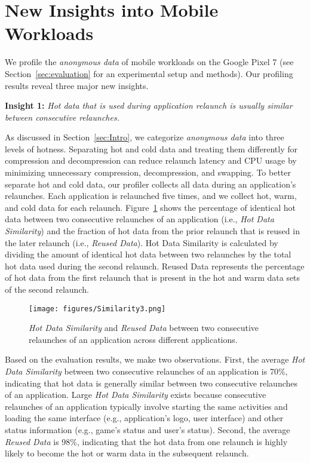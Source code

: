 \section{New Insights into Mobile Workloads} 
\label{sec:insights}
We profile the \emph{anonymous data} of mobile workloads on the Google Pixel 7 (see Section~\ref{sec:evaluation} for an experimental setup and methods). Our profiling results reveal three major new insights.

\noindent\textbf{Insight 1:} \textit{Hot data that is used during application relaunch is usually similar between consecutive relaunches.}

As discussed in Section~\ref{sec:Intro}, we categorize \emph{anonymous data} into three levels of hotness. Separating hot and cold data and treating them differently for compression and decompression can reduce relaunch latency and CPU usage by minimizing unnecessary compression, decompression, and swapping. 
To better separate hot and cold data, our profiler collects all data during an application's relaunches.  Each application is relaunched five times, and we collect hot, warm, and cold data for each relaunch. 
Figure~\ref{fig:similarity} shows the percentage of identical hot data between two consecutive relaunches of an application (i.e., \emph{Hot Data Similarity}) and the fraction of hot data from the prior relaunch that is reused in the later relaunch (i.e., \emph{Reused Data}). Hot Data Similarity is calculated by dividing the amount of identical hot data between two relaunches by the total hot data used during the second relaunch. Reused Data represents the percentage of hot data from the first relaunch that is present in the hot and warm data sets of the second relaunch. 

\begin{figure}[!h]
\vspace{0.3em}
\centering
\texttt{[image: figures/Similarity3.png]}
\caption{\emph{Hot Data Similarity} and \emph{Reused Data} between two consecutive relaunches of an application across different applications.}
\label{fig:similarity}
\end{figure}


Based on the evaluation results, we make two observations. First, the average \emph{Hot Data Similarity} between two consecutive relaunches of an application is 70\%, indicating that hot data is generally similar between two consecutive relaunches of an application. Large \emph{Hot Data Similarity} exists because consecutive relaunches of an application typically involve starting the same activities and loading the same interface (e.g., application's logo, user interface) and other status information (e.g., game's status and user's status). 
Second, the average \emph{Reused Data} is 98\%, indicating that the hot data from one relaunch is highly likely to become the hot or warm data in the subsequent relaunch.

